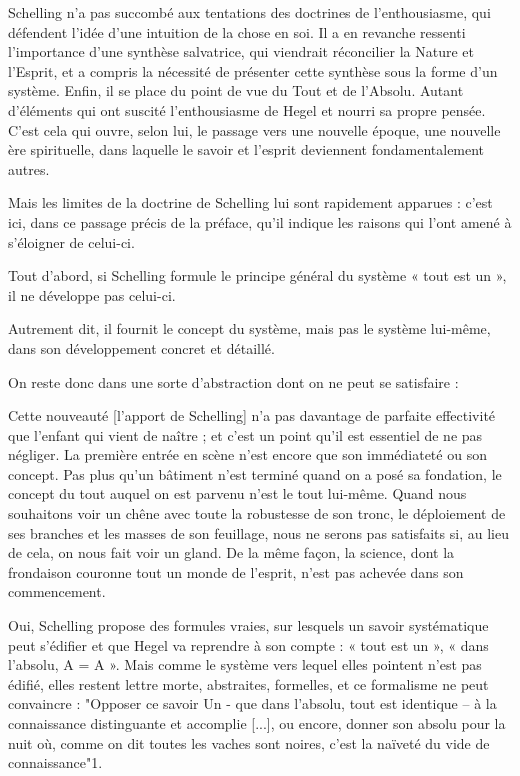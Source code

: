 Schelling n’a pas succombé aux tentations des doctrines de l’enthousiasme, qui défendent l’idée d’une intuition de la chose en soi. Il a en revanche ressenti l’importance d’une synthèse salvatrice, qui viendrait réconcilier la Nature et l’Esprit, et a compris la nécessité de présenter cette synthèse sous la forme d’un système. Enfin, il se place du point de vue du Tout et de l’Absolu. Autant d’éléments qui ont suscité l’enthousiasme de Hegel et nourri sa propre pensée. C’est cela qui ouvre, selon lui, le passage vers une nouvelle époque, une nouvelle ère spirituelle, dans laquelle le savoir et l’esprit deviennent fondamentalement autres.

Mais les limites de la doctrine de Schelling lui sont rapidement apparues : c’est ici, dans ce passage précis de la préface, qu’il indique les raisons qui l’ont amené à s’éloigner de celui-ci.

Tout d’abord, si Schelling formule le principe général du système « tout est un », il ne développe pas celui-ci.

Autrement dit, il fournit le concept du système, mais pas le système lui-même, dans son développement concret et détaillé.

On reste donc dans une sorte d’abstraction dont on ne peut se satisfaire :

    Cette nouveauté [l’apport de Schelling] n’a pas davantage de parfaite effectivité que l’enfant qui vient de naître ; et c’est un point qu’il est essentiel de ne pas négliger. La première entrée en scène n’est encore que son immédiateté ou son concept. Pas plus qu’un bâtiment n’est terminé quand on a posé sa fondation, le concept du tout auquel on est parvenu n’est le tout lui-même. Quand nous souhaitons voir un chêne avec toute la robustesse de son tronc, le déploiement de ses branches et les masses de son feuillage, nous ne serons pas satisfaits si, au lieu de cela, on nous fait voir un gland. De la même façon, la science, dont la frondaison couronne tout un monde de l’esprit, n’est pas achevée dans son commencement.


Oui, Schelling propose des formules vraies, sur lesquels un savoir systématique peut s’édifier et que Hegel va reprendre à son compte : « tout est un », « dans l’absolu, A = A ». Mais comme le système vers lequel elles pointent n’est pas édifié, elles restent lettre morte, abstraites, formelles, et ce formalisme ne peut convaincre : "Opposer ce savoir Un - que dans l’absolu, tout est identique – à la connaissance distinguante et accomplie [...], ou encore, donner son absolu pour la nuit où, comme on dit toutes les vaches sont noires, c’est la naïveté du vide de connaissance"1.

